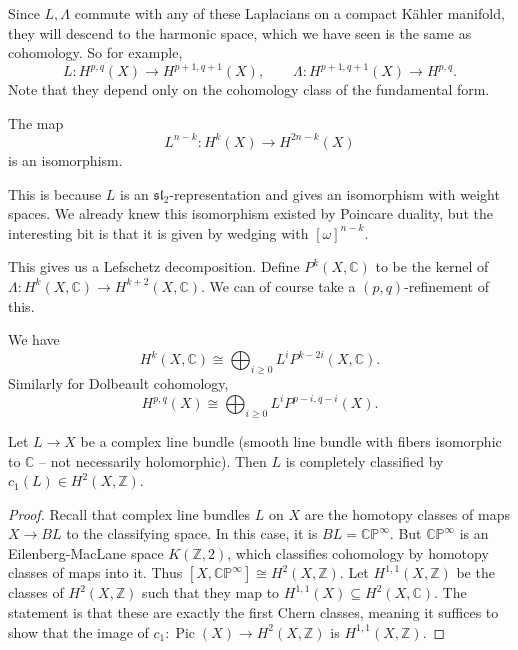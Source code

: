 Since $L,\Lambda $ commute with any of these Laplacians on a compact K\"ahler manifold, they will descend to the harmonic space, which we have seen is the same as cohomology. So for example,
\[
	L : H^{p,q} (X) \to H^{p+1,q+1} (X),\qquad \Lambda : H^{p+1,q+1} (X) \to H^{p,q} 
.\]
Note that they depend only on the cohomology class of the fundamental form.

\begin{theorem}\label{thm:hard}
	The map
	\[
		L^{n-k} : H^k(X) \to H^{2n-k} (X)
	\]
	is an isomorphism.
\end{theorem}
This is because $L$ is an $\mathfrak{sl} _2$-representation and gives an isomorphism with weight spaces. We already knew this isomorphism existed by Poincare duality, but the interesting bit is that it is given by wedging with $[\omega ]^{n-k} $.

This gives us a Lefschetz decomposition. Define $P^k(X,\mathbb{C} )$ to be the kernel of $\Lambda : H^k(X,\mathbb{C} ) \to H^{k+2} (X,\mathbb{C} )$. We can of course take a $(p,q)$-refinement of this.

\begin{theorem}\label{thm:owo}
	We have
	\[
		H^k(X,\mathbb{C} )\cong \bigoplus_{i\geq 0} L^iP^{k-2i} (X,\mathbb{C} )
	.\]
	Similarly for Dolbeault cohomology,
	\[
		H^{p,q} (X) \cong \bigoplus_{i\geq 0} L^iP^{p-i,q-i} (X)
	.\]
\end{theorem}
\begin{theorem}\label{thm:1}
	Let $L\to X$ be a complex line bundle (smooth line bundle with fibers isomorphic to $\mathbb{C} $ -- not necessarily holomorphic). Then $L$ is completely classified by $c_1(L)\in H^2(X,\mathbb{Z} )$.
\end{theorem}
\begin{proof}
	Recall that complex line bundles $L$ on $X$ are the homotopy classes of maps $X\to BL$ to the classifying space. In this case, it is $BL=\mathbb{C} \mathbb{P} ^\infty $. But $\mathbb{C} \mathbb{P} ^\infty $ is an Eilenberg-MacLane space $K(\mathbb{Z} ,2)$, which classifies cohomology by homotopy classes of maps into it. Thus $[X,\mathbb{C} \mathbb{P} ^\infty ] \cong H^2(X,\mathbb{Z} )$. Let $H^{1,1} (X,\mathbb{Z} )$ be the classes of $H^2(X,\mathbb{Z} )$ such that they map to $H^{1,1}(X)\subseteq H^2(X,\mathbb{C} )$. The statement is that these are exactly the first Chern classes, meaning it suffices to show that the image of $c_1 : \operatorname{Pic} (X) \to H^2(X,\mathbb{Z} )$ is $H^{1,1} (X,\mathbb{Z} )$.
\end{proof}

